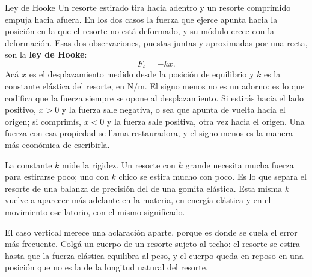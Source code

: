 \documentclass[11pt,openany]{book}
\begin{document}
\begin{bloque}{Ley de Hooke}
Un resorte estirado tira hacia adentro y un resorte comprimido empuja hacia afuera. En los dos casos la fuerza que ejerce apunta hacia la posición en la que el resorte no está deformado, y su módulo crece con la deformación. Esas dos observaciones, puestas juntas y aproximadas por una recta, son la \textbf{ley de Hooke}:
\[
F_s = -kx .
\]
Acá $x$ es el desplazamiento medido desde la posición de equilibrio y $k$ es la constante elástica del resorte, en $\mathrm{N/m}$. El signo menos no es un adorno: es lo que codifica que la fuerza siempre se opone al desplazamiento. Si estirás hacia el lado positivo, $x > 0$ y la fuerza sale negativa, o sea que apunta de vuelta hacia el origen; si comprimís, $x < 0$ y la fuerza sale positiva, otra vez hacia el origen. Una fuerza con esa propiedad se llama restauradora, y el signo menos es la manera más económica de escribirla.

La constante $k$ mide la rigidez. Un resorte con $k$ grande necesita mucha fuerza para estirarse poco; uno con $k$ chico se estira mucho con poco. Es lo que separa el resorte de una balanza de precisión del de una gomita elástica. Esta misma $k$ vuelve a aparecer más adelante en la materia, en energía elástica y en el movimiento oscilatorio, con el mismo significado.

El caso vertical merece una aclaración aparte, porque es donde se cuela el error más frecuente. Colgá un cuerpo de un resorte sujeto al techo: el resorte se estira hasta que la fuerza elástica equilibra al peso, y el cuerpo queda en reposo en una posición que no es la de la longitud natural del resorte.

\begin{center}
\end{center}


\end{bloque}
\end{document}
